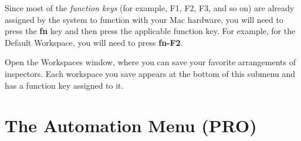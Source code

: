 \documentclass[../main.tex]{subfiles}
\begin{document}
  \begin{ognote}
    Since most of the \textit{function keys} (for example, F1, F2, F3, and so on) are already
    assigned by the system to function with your Mac hardware, you will need to press the
    \textbf{fn} key and then press the applicable function key. For example, for the Default
    Workspace, you will need to press \textbf{fn-F2}.
  \end{ognote}

  \begin{description}[style=nextline]
    \item[{Edit Workspaces}] Open the Workspaces window, where you can save your favorite
      arrangements of inspectors. Each workspace you save appears at the bottom of this submenu
      and has a function key assigned to it.
  \end{description}

  \section{The Automation Menu (\texorpdfstring{\textbf{PRO}}{PRO})}
\end{document}
